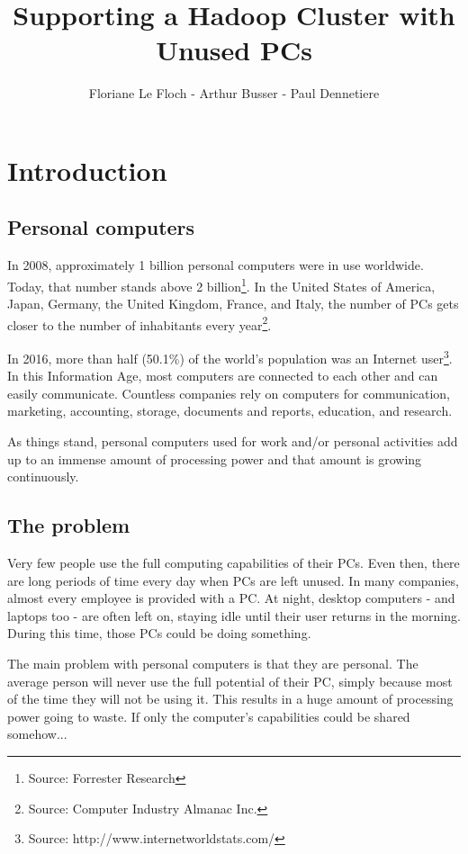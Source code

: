 \documentclass[11pt]{report} %
\title{Supporting a Hadoop Cluster with Unused PCs}
\author{Floriane Le Floch - Arthur Busser - Paul Dennetiere}
\begin{document}
\maketitle
\renewcommand{\contentsname}{Summary}
\newpage
\tableofcontents
\newpage

\chapter{Introduction}

\section{Personal computers}
In 2008, approximately 1 billion personal computers were in use worldwide. Today, that number stands above 2 billion\footnote{Source: Forrester Research}. In the United States of America, Japan, Germany, the United Kingdom, France, and Italy, the number of PCs gets closer to the number of inhabitants every year\footnote{Source: Computer Industry Almanac Inc.}.

In 2016, more than half (50.1\%) of the world's population was an Internet user\footnote{Source: http://www.internetworldstats.com/}. In this Information Age, most computers are connected to each other and can easily communicate. Countless companies rely on computers for communication, marketing, accounting, storage, documents and reports, education, and research.

As things stand, personal computers used for work and/or personal activities add up to an immense amount of processing power and that amount is growing continuously.

\section{The problem}
Very few people use the full computing capabilities of their PCs. Even then, there are long periods of time every day when PCs are left unused. In many companies, almost every employee is provided with a PC. At night, desktop computers - and laptops too - are often left on, staying idle until their user returns in the morning. During this time, those PCs could be doing something.

The main problem with personal computers is that they are personal. The average person will never use the full potential of their PC, simply because most of the time they will not be using it. This results in a huge amount of processing power going to waste. If only the computer's capabilities could be shared somehow...
  
\end{document}
